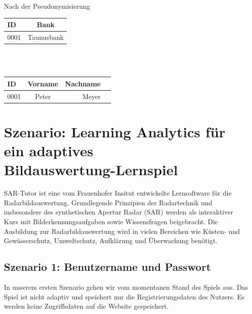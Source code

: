 \documentclass[a4paper, 12pt]{article}
\begin{document}
\noindent Nach der Pseudonymisierung\\

\begin{tabular}{lc}
	
	ID & Bank \\
	\hline
	0001 & Taunusbank
	
\end{tabular}\\\\

\begin{tabular}{lcrr}
	
	ID & Vorname & Nachname\\
	\hline
	0001 & Peter & Meyer
	
\end{tabular}

\section{Szenario: Learning Analytics für ein adaptives \\Bildauswertung-Lernspiel}

SAR-Tutor ist eine vom Frauenhofer Insitut entwickelte Lernsoftware für die Radarbildauswertung. Grundlegende Prinzipien der Radartechnik und insbesondere des synthetischen Apertur Radar (SAR) werden als interaktiver Kurs mit Bilderkennungsaufgaben sowie Wissensfragen beigebracht. Die Ausbildung zur Radarbildauswertung wird in vielen Bereichen wie Küsten- und Gewässerschutz, Umweltschutz, Aufklärung und Überwachung benötigt. \\

\subsection{Szenario 1: Benutzername und Passwort}
In unserem ersten Szenario gehen wir vom momentanen Stand des Spiels aus. Das Spiel ist nicht adaptiv und speichert nur die Registrierungsdaten des Nutzers. Es werden keine Zugriffsdaten auf die Website gespeichert.\\
\end{document}
